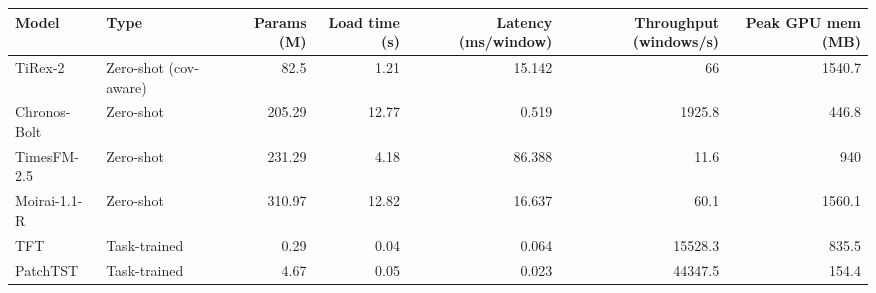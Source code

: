 \begin{tabular}{llrrrrr}
\toprule
Model & Type & Params (M) & Load time (s) & Latency (ms/window) & Throughput (windows/s) & Peak GPU mem (MB) \\
\midrule
TiRex-2 & Zero-shot (cov-aware) & 82.5 & 1.21 & 15.142 & 66 & 1540.7 \\
Chronos-Bolt & Zero-shot & 205.29 & 12.77 & 0.519 & 1925.8 & 446.8 \\
TimesFM-2.5 & Zero-shot & 231.29 & 4.18 & 86.388 & 11.6 & 940 \\
Moirai-1.1-R & Zero-shot & 310.97 & 12.82 & 16.637 & 60.1 & 1560.1 \\
TFT & Task-trained & 0.29 & 0.04 & 0.064 & 15528.3 & 835.5 \\
PatchTST & Task-trained & 4.67 & 0.05 & 0.023 & 44347.5 & 154.4 \\
\bottomrule
\end{tabular}
